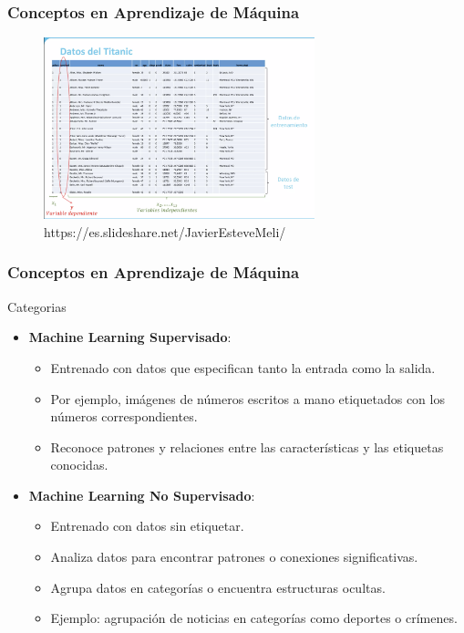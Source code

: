 \documentclass{beamer}
\begin{document}
\begin{frame}
\frametitle{Conceptos en Aprendizaje de Máquina}
	\begin{block}{}
\begin{figure}
	\includegraphics[width=0.7\textwidth]{Titanic}
	\caption{https://es.slideshare.net/JavierEsteveMeli/}
	\centering
\end{figure}
\end{block}
\end{frame}


\begin{frame}
	\frametitle{Conceptos en Aprendizaje de Máquina}
		\begin{block}{Categorias}
	
	\begin{itemize}
		\item \textbf{Machine Learning Supervisado}:
		\begin{itemize}
			\item Entrenado con datos que especifican tanto la entrada como la salida.
			\item Por ejemplo, imágenes de números escritos a mano etiquetados con los números correspondientes.
			\item Reconoce patrones y relaciones entre las características y las etiquetas conocidas.
		\end{itemize}
		
		\item \textbf{Machine Learning No Supervisado}:
		\begin{itemize}
			\item Entrenado con datos sin etiquetar.
			\item Analiza datos para encontrar patrones o conexiones significativas.
			\item Agrupa datos en categorías o encuentra estructuras ocultas.
			\item Ejemplo: agrupación de noticias en categorías como deportes o crímenes.
		\end{itemize}
	\end{itemize}
		\end{block}
\end{frame}
\end{document}
